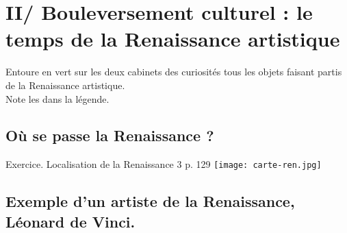 \documentclass{beamer}
\begin{document}





\section{II/ Bouleversement culturel : le temps de la Renaissance artistique}

\begin{frame}
Entoure en vert sur les deux cabinets des curiosités tous les objets faisant partis de la Renaissance artistique. \\
Note les dans la légende.

\end{frame}


\subsection{Où se passe la Renaissance ?}

\begin{frame}{Exercice. Localisation de la Renaissance}
3 p. 129
\texttt{[image: carte-ren.jpg]}
\end{frame}

\subsection{Exemple d'un artiste de la Renaissance, Léonard de Vinci.}
\end{document}
